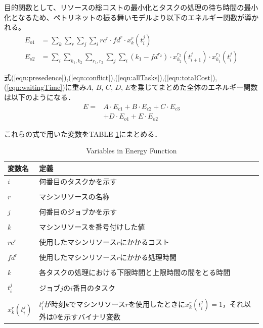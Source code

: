 \documentclass[conference]{IEEEtran}
\begin{document}
目的関数として、リソースの総コストの最小化とタスクの処理の待ち時間の最小化となるため、ペトリネットの振る舞いモデルより以下のエネルギー関数が導かれる。
\begin{align}
E_{o1} &=\sum_k \sum_r \sum_j \sum_i rc^r \cdot fd^r \cdot x_{k}^{r}(t_{i}^{j}) \label{eqn:totalCost}\\
E_{o2} &= \sum_i \sum_{k_1,k_2} \sum_{r_1,r_2} \sum_j \sum_i ({k_1 - fd^{r_2}}) \cdot x_{k_2}^{r_2}(t_{i+1}^{j}) \cdot x_{k_1}^{r_1}(t_{i}^{j}) \label{eqn:waitingTime}
\end{align}


式(\ref{eqn:presedence}),(\ref{eqn:conflict}),(\ref{eqn:allTasks}),(\ref{eqn:totalCost}),(\ref{eqn:waitingTime})に重み$A$, $B$, $C$, $D$, $E$を乗じてまとめた全体のエネルギー関数は以下のようになる．
\begin{align}
E = 
&A \cdot E_{c1} + B \cdot E_{c2} + C \cdot E_{c3} \\
&+ D \cdot E_{o1} + E \cdot E_{o2}
\end{align}

これらの式で用いた変数をTABLE \ref{variable}にまとめる．

\begin{table}[h]
\centering
\caption{Variables in Energy Function}
\begin{tabularx}{0.45\textwidth}{>{\centering\arraybackslash}p{1.7cm}|X}
\hline
変数名 & 定義 \\ \hline 
$i$ & 何番目のタスクかを示す  \\ 
 & \\
$r$ & マシンリソースの名称 \\ 
 & \\
$j$ & 何番目のジョブかを示す \\ 
 & \\
$k$ & マシンリソースを番号付けした値 \\ 
 & \\
$rc^r$ & 使用したマシンリソース$r$にかかるコスト  \\ 
 & \\
$fd^r$ & 使用したマシンリソース$r$にかかる処理時間  \\ 
 & \\
$k$ & 各タスクの処理における下限時間と上限時間の間をとる時間  \\ 
 & \\
$t_{i}^{j}$ & ジョブ$j$の$i$番目のタスク  \\ 
 & \\
 $x_{k}^{r}(t_{i}^{j})$ & $t_{i}^{j}$が時刻$k$でマシンリソース$r$を使用したときに$x_{k}^{r}(t_{i}^{j})=1$，それ以外は0を示すバイナリ変数 \\ \hline

\end{tabularx}
\label{variable}
\end{table}
\end{document}
